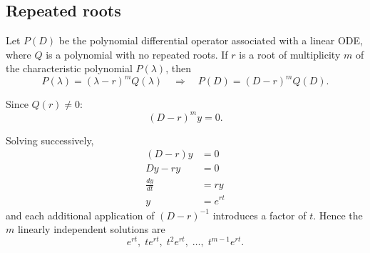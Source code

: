 \subsection{Repeated roots}

Let $P(D)$ be the polynomial differential operator associated with a linear ODE, where $Q$ is a polynomial with no repeated roots.
If $r$ is a root of multiplicity $m$ of the characteristic polynomial $P(\lambda)$,
then
\[
P(\lambda) = (\lambda - r)^m Q(\lambda)
\quad\Rightarrow\quad
P(D) = (D - r)^m Q(D).
\]

Since $Q(r)\neq 0$:
\[
(D-r)^m y = 0.
\]

Solving successively,
\begin{align*}
(D-r) y &= 0 \\
Dy - r y &= 0 \\
\frac{dy}{dt} &= r y \\
y &= e^{rt}
\end{align*}
and each additional application of $(D-r)^{-1}$ introduces a factor of $t$.
Hence the $m$ linearly independent solutions are
\[
e^{rt},\; t e^{rt},\; t^2 e^{rt},\; \ldots,\; t^{m-1} e^{rt}.
\]



